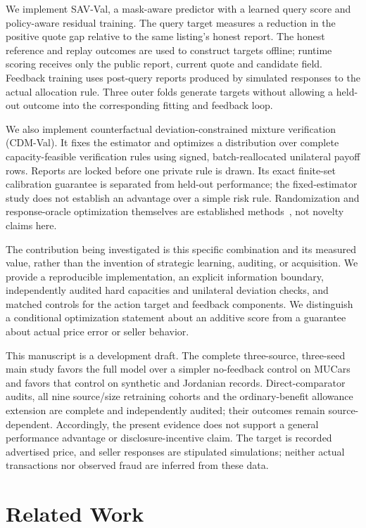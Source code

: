 \documentclass[10pt,journal]{IEEEtran}
\begin{document}
We implement SAV-Val, a mask-aware predictor with a learned query score
and policy-aware residual training. The query target measures a reduction
in the positive quote gap relative to the same listing's honest report.
The honest reference and replay outcomes are used to construct targets
offline; runtime scoring receives only the public report, current quote
and candidate field. Feedback training uses post-query reports produced
by simulated responses to the actual allocation rule. Three outer folds
generate targets without allowing a held-out outcome into the
corresponding fitting and feedback loop.

We also implement counterfactual deviation-constrained mixture verification
(CDM-Val). It fixes the estimator and optimizes a distribution over complete
capacity-feasible verification rules using signed, batch-reallocated
unilateral payoff rows. Reports are locked before one private rule is drawn.
Its exact finite-set calibration guarantee is separated from held-out
performance; the fixed-estimator study does not establish an advantage over a
simple risk rule. Randomization and response-oracle optimization themselves
are established methods~\cite{jain2011doubleoracle}, not novelty claims here.

The contribution being investigated is this specific combination and its
measured value, rather than the invention of strategic learning, auditing,
or acquisition. We provide a reproducible implementation, an explicit
information boundary, independently audited hard capacities and unilateral
deviation checks, and matched controls for the action target and feedback
components. We distinguish a conditional optimization statement about an
additive score from a guarantee about actual price error or seller behavior.

This manuscript is a development draft. The complete three-source,
three-seed main study favors the full model over a simpler no-feedback
control on MUCars and favors that control on synthetic and Jordanian
records. Direct-comparator audits, all nine source/size retraining cohorts
and the ordinary-benefit allowance extension are complete and independently
audited; their outcomes remain source-dependent.
Accordingly, the present evidence
does not support a general performance advantage or disclosure-incentive
claim. The target is recorded advertised price, and seller responses are
stipulated simulations; neither actual transactions nor observed fraud
are inferred from these data.

\section{Related Work}
\end{document}
